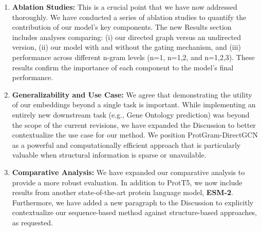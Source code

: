 \documentclass[11pt, a4paper]{article}
\begin{document}
	\begin{enumerate}[label=\arabic*., leftmargin=*]
		\item \textbf{Ablation Studies:} This is a crucial point that we have now addressed thoroughly. We have conducted a series of ablation studies to quantify the contribution of our model's key components. The new Results section includes analyses comparing: (i) our directed graph versus an undirected version, (ii) our model with and without the gating mechanism, and (iii) performance across different n-gram levels (n=1, n=1,2, and n=1,2,3). These results confirm the importance of each component to the model's final performance.
		
		\item \textbf{Generalizability and Use Case:} We agree that demonstrating the utility of our embeddings beyond a single task is important. While implementing an entirely new downstream task (e.g., Gene Ontology prediction) was beyond the scope of the current revisions, we have expanded the Discussion to better contextualize the use case for our method. We position ProtGram-DirectGCN as a powerful and computationally efficient approach that is particularly valuable when structural information is sparse or unavailable.
		
		\item \textbf{Comparative Analysis:} We have expanded our comparative analysis to provide a more robust evaluation. In addition to ProtT5, we now include results from another state-of-the-art protein language model, \textbf{ESM-2}. Furthermore, we have added a new paragraph to the Discussion to explicitly contextualize our sequence-based method against structure-based approaches, as requested.
		

\end{enumerate}
\end{document}
